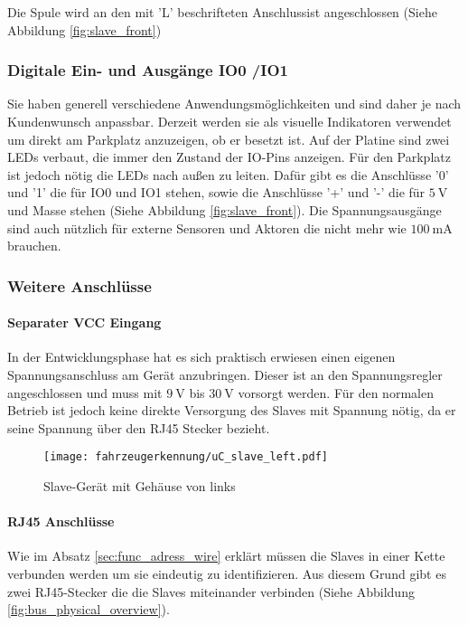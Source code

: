 Die Spule wird an den mit 'L' beschrifteten Anschlussist angeschlossen (Siehe Abbildung \ref{fig:slave_front})

\subsubsection{Digitale Ein- und Ausgänge IO0 /IO1}

Sie haben generell verschiedene Anwendungsmöglichkeiten und sind daher je nach Kundenwunsch anpassbar. Derzeit werden sie als visuelle Indikatoren verwendet um direkt am Parkplatz anzuzeigen, ob er besetzt ist. 
Auf der Platine sind zwei LEDs verbaut, die immer den Zustand der IO-Pins anzeigen. Für den Parkplatz ist jedoch nötig die LEDs nach außen zu leiten. Dafür gibt es die Anschlüsse '0' und '1' die für IO0 und IO1 stehen, sowie die Anschlüsse
'+' und '-' die für $\SI{5}{\volt}$ und Masse stehen (Siehe Abbildung \ref{fig:slave_front}). Die Spannungsausgänge sind auch nützlich für externe Sensoren und Aktoren die nicht mehr wie $\SI{100}{\milli\ampere}$ brauchen.

\subsubsection{Weitere Anschlüsse}
\paragraph{Separater VCC Eingang}\mbox{} 

In der Entwicklungsphase hat es sich praktisch erwiesen einen eigenen Spannungsanschluss am Gerät anzubringen. Dieser ist an den Spannungsregler angeschlossen und muss mit $\SI{9}{\volt}$ bis $\SI{30}{\volt}$ vorsorgt werden.
Für den normalen Betrieb ist jedoch keine direkte Versorgung des Slaves mit Spannung nötig, da er seine Spannung über den RJ45 Stecker bezieht.

\begin{figure}[H]
    \centering
    \texttt{[image: fahrzeugerkennung/uC\_slave\_left.pdf]}
    \caption{Slave-Gerät mit Gehäuse von links}
    \label{fig:slave_left}
\end{figure}

\paragraph{RJ45 Anschlüsse}\mbox{} 

Wie im Absatz \ref{sec:func_adress_wire} erklärt müssen die Slaves in einer Kette verbunden werden um sie eindeutig zu identifizieren. Aus diesem Grund gibt es zwei RJ45-Stecker die die Slaves miteinander verbinden (Siehe Abbildung \ref{fig:bus_physical_overview}).

